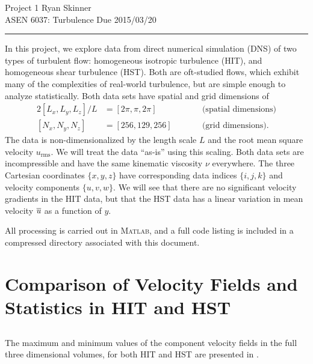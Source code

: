 \documentclass[11pt]{article}
\begin{document}
\pagestyle{fancyplain}
\lhead{}
\chead{}
\rhead{}
\cfoot{\thepage}

\noindent
{\Large \color{blue} Project 1}
\hfill
{\large Ryan Skinner}
\\[0.5ex]
{\large ASEN 6037: Turbulence}
\hfill
{\large Due 2015/03/20}
\hrule
\vspace{12pt}

In this project, we explore data from direct numerical simulation (DNS) of two types of turbulent flow: homogeneous isotropic turbulence (HIT), and homogeneous shear turbulence (HST). Both are oft-studied flows, which exhibit many of the complexities of real-world turbulence, but are simple enough to analyze statistically. Both data sets have spatial and grid dimensions of
\begin{alignat*}{2}
[ L_x, L_y, L_z ] / L &= [ 2\pi, \pi, 2\pi ]
\qquad && \text{(spatial dimensions)}
\\
[ N_x, N_y, N_z ] &= [ 256, 129, 256 ]
\qquad && \text{(grid dimensions)}
.
\end{alignat*}
The data is non-dimensionalized by the length scale $L$ and the root mean square velocity $u_\text{rms}$. We will treat the data ``as-is'' using this scaling. Both data sets are incompressible and have the same kinematic viscosity $\nu$ everywhere. The three Cartesian coordinates $\{x, y, z\}$ have corresponding data indices $\{i, j, k\}$ and velocity components $\{u, v, w\}$. We will see that there are no significant velocity gradients in the HIT data, but that the HST data has a linear variation in mean velocity $\overline{u}$ as a function of $y$.

All processing is carried out in \textsc{Matlab}, and a full code listing is included in a compressed directory associated with this document.

\section{Comparison of Velocity Fields and Statistics in HIT and HST}

\subsection{}

The maximum and minimum values of the component velocity fields in the full three dimensional volumes, for both HIT and HST are presented in .
\end{document}
